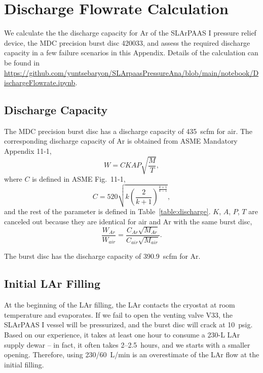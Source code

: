 \section{Discharge Flowrate Calculation}
\label{app:discharge}

We calculate the the discharge capacity for Ar of the SLArPAAS I pressure relief device, 
the MDC precision burst disc 420033,
and assess the required discharge capacity in a few failure scenarios in this Appendix.
Details of the calculation can be found in 
\url{https://github.com/yuntsebaryon/SLArpaasPressureAna/blob/main/notebook/DischargeFlowrate.ipynb}.

\subsection{Discharge Capacity}
\label{app:discharge_capacity}

The MDC precision burst disc has a discharge capacity of 435~scfm for air.
The corresponding discharge capacity of Ar is obtained from ASME Mandatory Appendix 11-1,
\begin{equation}
    \label{eq:discharge}
    W = CKAP\sqrt{\frac{M}{T}},
\end{equation}
where $C$ is defined in ASME Fig.~11-1,
\begin{equation}
    \label{eq:constant_k}
    C = 520\sqrt{k\left(\frac{2}{k+1}\right)^{\frac{k+1}{k-1}}},
\end{equation}
and the rest of the parameter is defined in Table~\ref{table:discharge}.
$K$, $A$, $P$, $T$ are canceled out because they are identical for air and Ar
with the same burst disc,
\begin{equation}
    \frac{W_{Ar}}{W_{air}} = \frac{C_{Ar}\sqrt{M_{Ar}}}{C_{air}\sqrt{M_{air}}}.
\end{equation}



The burst disc has the discharge capacity of 390.9~scfm for Ar.

\subsection{Initial LAr Filling}

At the beginning of the LAr filling, the LAr contacts the cryostat at room 
temperature and evaporates.
If we fail to open the venting valve V33, the SLArPAAS I vessel will be pressurized,
and the burst disc will crack at 10~psig.
Based on our experience, it takes at least one hour to consume a 230-L LAr
supply dewar -- in fact, it often takes 2--2.5~hours, and we starts with
a smaller opening.
Therefore, using 230/60~L/min is an overestimate of the LAr flow at the
initial filling. \\

